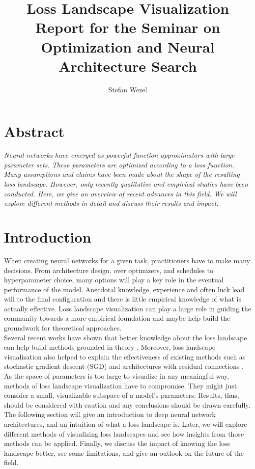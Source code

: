 \documentclass[a4paper]{scrartcl}
\title{\textbf{Loss Landscape Visualization}\\\small Report for the Seminar on Optimization and Neural Architecture Search}
\author{Stefan Wezel}
\begin{document}
	
	
	

\maketitle



\section*{Abstract}
\textit{Neural networks have emerged as powerful function approximators with large parameter sets. These parameters are optimized according to a loss function. Many assumptions and claims have been made about the shape of the resulting loss landscape. However, only recently qualitative and empirical studies have been conducted. Here, we give an overview of recent advances in this field. We will explore different methods in detail and discuss their results and impact.}



\section*{Introduction}
When creating neural networks for a given task, practitioners have to make many decisions. From architecture design, over optimizers, and schedules to hyperparameter choice, many options will play a key role in the eventual performance of the model. Anecdotal knowledge, experience and often luck lead will to the final configuration and there is little empirical knowledge of what is actually effective. Loss landscape visualization can play a large role in guiding the community towards a more empirical foundation and maybe help build the groundwork for theoretical approaches.\\
Several recent works have shown that better knowledge about the loss landscape can help build methods grounded in theory \cite{mutschler2020parabolic, chaudhari2019entropy}. Moreover, loss landscape visualization also helped to explain the effectiveness of existing methods such as stochastic gradient descent (SGD) \cite{robbins1951stochastic, xing2018walk} and architectures with residual connections \cite{he2016deep, li2017visualizing}.\\
As the space of parameters is too large to visualize in any meaningful way, methods of loss landscape visualization have to compromise. They might just consider a small, visualizable subspace of a model's parameters. Results, thus, should be considered with caution and any conclusions should be drawn carefully.\\
The following section will give an introduction to deep neural network architectures, and an intuition of what a loss landscape is. Later, we will explore different methods of visualizing loss landscapes and see how insights from those methods can be applied. Finally, we discuss the impact of knowing the loss landscape better, see some limitations, and give an outlook on the future of the field.
\end{document}

